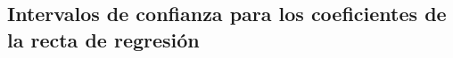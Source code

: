 \documentclass[10pt,a4paper]{article}\usepackage[]{graphicx}\usepackage[]{color}
\begin{document}
%
%
%
%

\subsection{Intervalos de confianza para los coeficientes de la recta de regresión}
\label{tut10:subsec:IntervalosConfianzaCoeficientesRectaRegresion}
\end{document}
